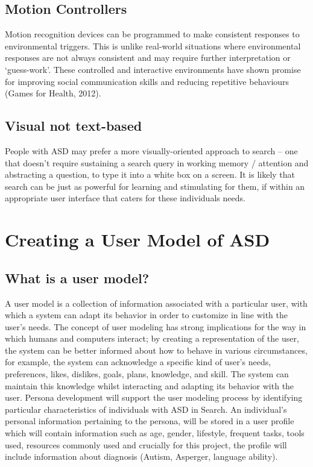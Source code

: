 \documentclass[10pt]{article}
\begin{document}
\subsection{Motion Controllers}
Motion recognition devices can be programmed to make consistent responses to environmental triggers. This is unlike real-world situations where environmental responses are not always consistent and may require further interpretation or ‘guess-work’. These controlled and interactive environments have shown promise for improving social communication skills and reducing repetitive behaviours (Games for Health, 2012).

\subsection{Visual not text-based}
People with ASD may prefer a more visually-oriented approach to search – one that doesn’t require sustaining a search query in working memory / attention and abstracting a question, to type it into a white box on a screen. It is likely that search can be just as powerful for learning and stimulating for them, if within an appropriate user interface that caters for these individuals needs.


\section {Creating a User Model of ASD}
\subsection{What is a user model?}
A user model is a collection of information associated with a particular user, with which a system can adapt its behavior in order to customize in line with the user’s needs. The concept of user modeling has strong implications for the way in which humans and computers interact; by creating a representation of the user, the system can be better informed about how to behave in various circumstances, for example, the system can acknowledge a specific kind of user’s needs, preferences, likes, dislikes, goals, plans, knowledge, and skill. The system can maintain this knowledge whilst interacting and adapting its behavior with the user.
Persona development will support the user modeling process by identifying particular characteristics of individuals with ASD in Search. An individual’s personal information pertaining to the persona, will be stored in a user profile which will contain information such as age, gender, lifestyle, frequent tasks, tools used, resources commonly used and crucially for this project, the profile will include information about diagnosis (Autism, Asperger, language ability).
\end{document}
